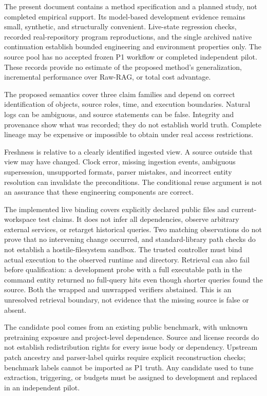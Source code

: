 \documentclass[
  11pt,
  a4paper,
]{article}
\begin{document}
\begin{sloppypar}

The present document contains a method specification and a planned study, not completed empirical support. Its model-based development evidence remains small, synthetic, and structurally convenient. Live-state regression checks, recorded real-repository program reproductions, and the single archived native continuation establish bounded engineering and environment properties only. The source pool has no accepted frozen P1 workflow or completed independent pilot. These records provide no estimate of the proposed method's generalization, incremental performance over Raw-RAG, or total cost advantage.

\end{sloppypar}

The proposed semantics cover three claim families and depend on correct
identification of objects, source roles, time, and execution boundaries.
Natural logs can be ambiguous, and source statements can be false.
Integrity and provenance show what was recorded; they do not establish
world truth. Complete lineage may be expensive or impossible to obtain
under real access restrictions.

Freshness is relative to a clearly identified ingested view. A source
outside that view may have changed. Clock error, missing ingestion
events, ambiguous supersession, unsupported formats, parser mistakes,
and incorrect entity resolution can invalidate the preconditions. The
conditional reuse argument is not an assurance that these engineering
components are correct.

The implemented live binding covers explicitly declared public files and
current-workspace test claims. It does not infer all dependencies,
observe arbitrary external services, or retarget historical queries. Two
matching observations do not prove that no intervening change occurred,
and standard-library path checks do not establish a hostile-filesystem
sandbox. The trusted controller must bind actual execution to the
observed runtime and directory. Retrieval can also fail before
qualification: a development probe with a full executable path in the
command entity returned no full-query hits even though shorter queries
found the source. Both the wrapped and unwrapped verifiers abstained.
This is an unresolved retrieval boundary, not evidence that the missing
source is false or absent.

The candidate pool comes from an existing public benchmark, with unknown
pretraining exposure and project-level dependence. Source and license
records do not establish redistribution rights for every issue body or
dependency. Upstream patch ancestry and parser-label quirks require
explicit reconstruction checks; benchmark labels cannot be imported as
P1 truth. Any candidate used to tune extraction, triggering, or budgets
must be assigned to development and replaced in an independent pilot.
\end{document}
